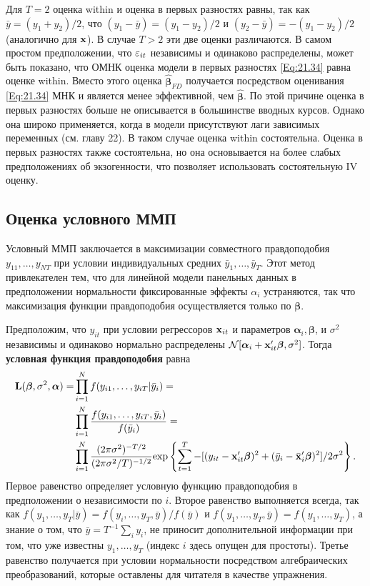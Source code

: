 Для $T=2$ оценка within и оценка в первых разностях равны, так как $\bar{y}=(y_1+y_2)/2$, что $(y_1-\bar{y})=(y_1-y_2)/2$ и $(y_2-\bar{y})=-(y_1-y_2)/2$ (аналогично для $\mathbf{x}$). В случае $T>2$ эти две оценки различаются. В самом простом предположении, что $\varepsilon_{it}$ независимы и одинаково распределены, может быть показано, что ОМНК оценка модели в первых разностях \ref{Eq:21.34} равна оценке within. Вместо этого оценка $\hat{\bm\beta}_{FD}$ получается посредством оценивания  \ref{Eq:21.34} МНК  и является менее эффективной, чем $\hat{\bm\beta}$. По этой причине оценка в первых разностях больше не описывается в большинстве вводных курсов. Однако она широко применяется, когда в модели присутствуют лаги зависимых переменных (см. главу 22). В таком случае оценка within состоятельна. Оценка в первых разностях также состоятельна, но она основывается на более слабых предположениях об экзогенности, что позволяет использовать состоятельную IV оценку.

\subsection{Оценка условного ММП}

Условный ММП заключается в максимизации совместного правдоподобия $y_{11}, \dots, y_{NT}$ при условии индивидуальных средних $\bar{y}_1, \dots, \bar{y}_T$. Этот метод привлекателен тем, что для линейной модели панельных данных в предположении нормальности фиксированные эффекты $\alpha_i$ устраняются, так что максимизация функции правдоподобия осуществляется только по $\bm\beta$.

Предположим, что $y_{it}$ при условии регрессоров $\mathbf{x}_{it}$ и параметров $\bm\alpha_i, \bm\beta$, и  $\sigma^2$ независимы и одинаково нормально распределены $\mathcal N [\bm\alpha_i+\mathbf{x}'_{it}\bm\beta, \sigma^2]$. Тогда \textbf{условная функция правдоподобия} равна
\begin{align}
\mathbf L(\bm\beta, \sigma^2, \bm\alpha)=
& \prod^N_{i=1} f(y_{i1}, \dots, y_{iT}|\bar{y}_i) =  \label{Eq:21.38} \\
& \prod^N_{i=1} \frac{f(y_{i1}, \dots, y_{iT}, \bar{y}_i)} {f(\bar{y}_i)} = \nonumber \\
& \prod^N_{i=1} \frac{(2\pi\sigma^2)^{-T/2}}{(2\pi\sigma^2/T)^{-1/2}}\mathrm{exp}
\left\{ \sum^{T}_{t=1} -[(y_{it}-\mathbf{x}'_{it}\bm\beta)^2+(\bar{y}_i-\bar{\mathbf{x}}'_i\bm\beta)^2]/2\sigma^2 \right\}. \nonumber
\end{align}
Первое равенство определяет условную функцию правдоподобия в предположении о независимости по $i$. Второе равенство выполняется всегда, так как $f(y_1, \dots, y_T|\bar{y})=f(y_i, \dots, y_T, \bar{y})/f(\bar{y})$ и $f(y_1, \dots, y_T, \bar{y})=f(y_1, \dots, y_T)$, а знание о том, что $\bar{y}=T^{-1}\sum_i y_i$, не приносит дополнительной информации при том, что уже известны $y_1, \dots, y_T$ (индекс $i$ здесь опущен для простоты). Третье равенство получается при условии нормальности посредством алгебраических преобразований, которые оставлены для читателя в качестве упражнения.

